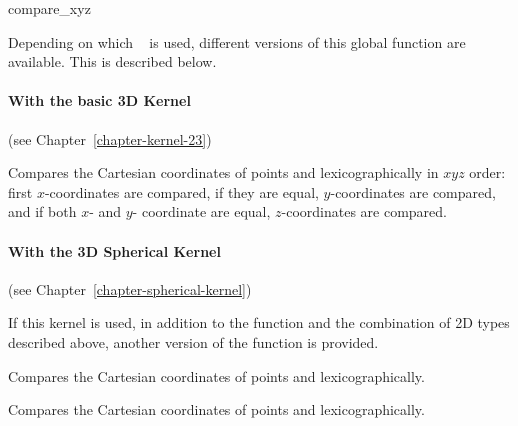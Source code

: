 \begin{ccRefFunction}{compare_xyz}


Depending on which \cgal\  is used,
different versions of this global function are available. This is
described below.

\paragraph{With the basic 3D Kernel} (see Chapter~\ref{chapter-kernel-23})

      {Compares the Cartesian coordinates of points  and
        lexicographically in $xyz$ order: first 
       $x$-coordinates are compared, if they are equal, $y$-coordinates
       are compared, and if both $x$- and $y$- coordinate are equal,
       $z$-coordinates are compared.}

\paragraph{With the 3D Spherical Kernel} (see Chapter~\ref{chapter-spherical-kernel}) 


If this kernel is used, in addition to the function and the
combination of 2D types described above, another version of the function
is provided.

{Compares the Cartesian coordinates of points  and
        lexicographically.}

{Compares the Cartesian coordinates of points  and
        lexicographically.}


\ccSeeAlso
{} \\
 \\
 \\
 \\
 \\
 \\
 \\

\end{ccRefFunction}

